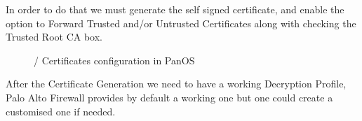 In order to do that we must generate the  self signed certificate, and enable the option to Forward Trusted and/or Untrusted Certificates along with checking the Trusted Root CA box.

\begin{figure}[!hb]
\centering
 \hspace{0.5cm}
 \caption{/ Certificates configuration in PanOS}\label{Certificates}
\end{figure}

\newpage

After the Certificate Generation we need to have a working Decryption Profile, Palo Alto Firewall provides by default a working one but one could create a customised one if needed.

